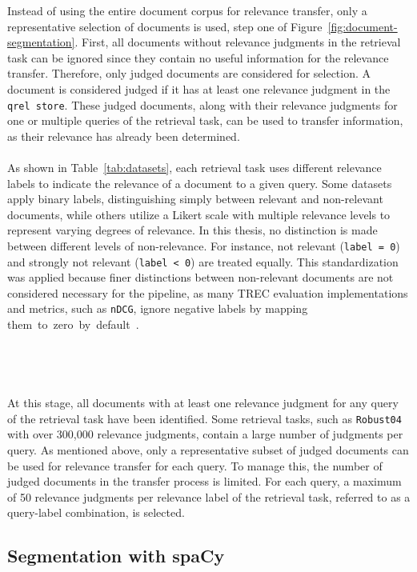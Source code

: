 Instead of using the entire document corpus for relevance transfer, only a representative selection of documents is used, step one of Figure~\ref{fig:document-segmentation}. First, all documents without relevance judgments in the retrieval task can be ignored since they contain no useful information for the relevance transfer. Therefore, only judged documents are considered for selection. A document is considered judged if it has at least one relevance judgment in the \texttt{qrel store}. These judged documents, along with their relevance judgments for one or multiple queries of the retrieval task, can be used to transfer information, as their relevance has already been determined.
\\\\
As shown in Table~\ref{tab:datasets}, each retrieval task uses different relevance labels to indicate the relevance of a document to a given query. Some datasets apply binary labels, distinguishing simply between relevant and non-relevant documents, while others utilize a Likert scale with multiple relevance levels to represent varying degrees of relevance. In this thesis, no distinction is made between different levels of non-relevance. For instance, \glqq not relevant\grqq{} \mbox{(\texttt{label = 0})} and \glqq strongly not relevant\grqq{} (\texttt{label < 0}) are treated equally. This standardization was applied because finer distinctions between non-relevant documents are not considered necessary for the pipeline, as many TREC evaluation implementations and metrics, such as \texttt{nDCG}, ignore negative labels by mapping \mbox{them to zero by default \cite{gienapp:2020}}.
\\\\\\\\\\
At this stage, all documents with at least one relevance judgment for any query of the retrieval task have been identified. Some retrieval tasks, such as \texttt{Robust04} with over 300,000 relevance judgments, contain a large number of judgments per query. As mentioned above, only a representative subset of judged documents can be used for relevance transfer for each query. To manage this, the number of judged documents in the transfer process is limited. For each query, a maximum of 50 relevance judgments per relevance label of the retrieval task, referred to as a query-label combination, is selected.

\subsection{Segmentation with spaCy}\label{segmentation-with-spacy}

